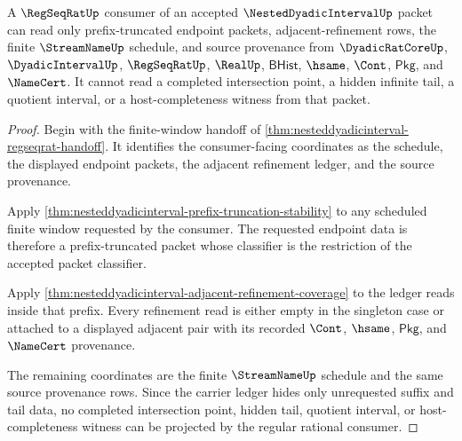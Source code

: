 \begin{theorem}
\label{thm:nesteddyadicinterval-regseqrat-window-exhaustion}
A $\RegSeqRatUp$ consumer of an accepted $\NestedDyadicIntervalUp$ packet can read only prefix-truncated endpoint packets, adjacent-refinement rows, the finite $\StreamNameUp$ schedule, and source provenance from $\DyadicRatCoreUp$, $\DyadicIntervalUp$, $\RegSeqRatUp$, $\RealUp$, $\mathsf{BHist}$, $\hsame$, $\Cont$, $\mathsf{Pkg}$, and $\NameCert$. It cannot read a completed intersection point, a hidden infinite tail, a quotient interval, or a host-completeness witness from that packet.
\end{theorem}
\begin{proof}
Begin with the finite-window handoff of \autoref{thm:nesteddyadicinterval-regseqrat-handoff}. It identifies the consumer-facing coordinates as the schedule, the displayed endpoint packets, the adjacent refinement ledger, and the source provenance.

Apply \autoref{thm:nesteddyadicinterval-prefix-truncation-stability} to any scheduled finite window requested by the consumer. The requested endpoint data is therefore a prefix-truncated packet whose classifier is the restriction of the accepted packet classifier.

Apply \autoref{thm:nesteddyadicinterval-adjacent-refinement-coverage} to the ledger reads inside that prefix. Every refinement read is either empty in the singleton case or attached to a displayed adjacent pair with its recorded $\Cont$, $\hsame$, $\mathsf{Pkg}$, and $\NameCert$ provenance.

The remaining coordinates are the finite $\StreamNameUp$ schedule and the same source provenance rows. Since the carrier ledger hides only unrequested suffix and tail data, no completed intersection point, hidden tail, quotient interval, or host-completeness witness can be projected by the regular rational consumer.
\end{proof}

